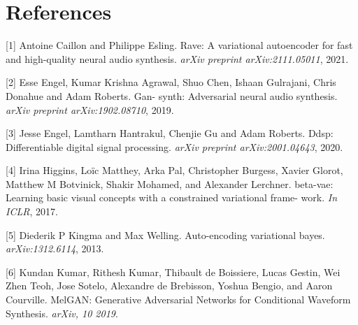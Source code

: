\documentclass{article}
\begin{document}
\section*{References}



[1] Antoine Caillon and Philippe Esling.  Rave: A variational autoencoder for fast and high-quality neural audio synthesis. \textit{arXiv preprint arXiv:2111.05011}, 2021.


[2] Esse Engel, Kumar Krishna Agrawal, Shuo Chen, Ishaan Gulrajani, Chris Donahue and Adam Roberts. Gan- synth: Adversarial neural audio synthesis. \textit{arXiv preprint arXiv:1902.08710}, 2019.


[3] Jesse Engel, Lamtharn Hantrakul, Chenjie Gu and Adam Roberts. Ddsp: Differentiable digital signal processing. \textit{arXiv preprint arXiv:2001.04643}, 2020.

[4] Irina Higgins, Loïc Matthey, Arka Pal, Christopher Burgess, Xavier Glorot, Matthew M Botvinick, Shakir Mohamed, and Alexander Lerchner. beta-vae: Learning basic visual concepts with a constrained variational frame- work. \textit{In ICLR}, 2017.


[5] Diederik P Kingma and Max Welling. Auto-encoding variational bayes. \textit{arXiv:1312.6114}, 2013. 



[6] Kundan Kumar, Rithesh Kumar, Thibault de Boissiere, Lucas Gestin, Wei Zhen Teoh, Jose Sotelo, Alexandre de Brebisson, Yoshua Bengio, and Aaron Courville. MelGAN: Generative Adversarial Networks for Conditional Waveform Synthesis. \textit{arXiv, 10 2019}.


\end{document}
